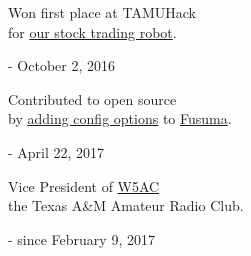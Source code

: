\documentclass{article}
\begin{document}
\noindent
\begin{minipage}[t]{0.33\textwidth}
Won first place at TAMUHack \\
for \href{https://devpost.com/software/midas-evi574}{our stock trading robot}.

\hfill - October 2, 2016
\end{minipage}\hfill
\begin{minipage}[t]{0.33\textwidth}
Contributed to open source \\
by \href{https://github.com/iberianpig/fusuma/pull/36}{adding config options} to \href{https://github.com/iberianpig/fusuma}{Fusuma}.

\hfill - April 22, 2017
\end{minipage}\hfill
\begin{minipage}[t]{0.33\textwidth}
Vice President of \href{http://w5ac.tamu.edu}{W5AC} \\
the Texas A\&M Amateur Radio Club.

\hfill - since February 9, 2017
\end{minipage}

\end{document}
